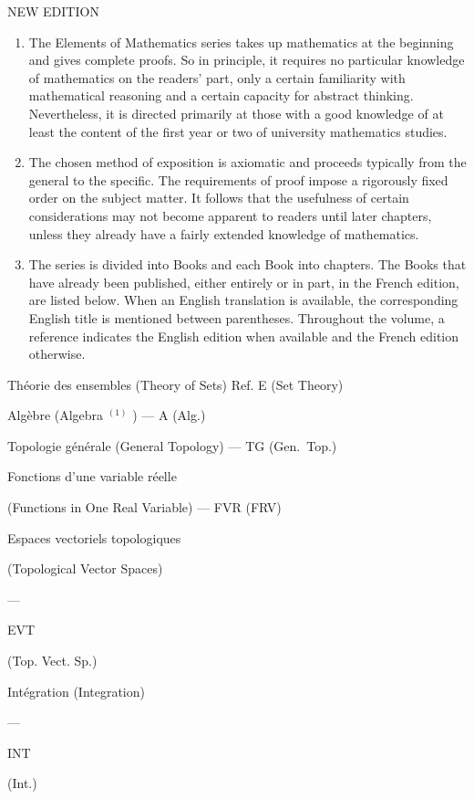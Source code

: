 
NEW EDITION

\begin{enumerate}
\def\labelenumi{\arabic{enumi}.}
\item
  The Elements of Mathematics series takes up mathematics at the beginning and gives complete proofs. So in principle, it requires no particular knowledge of mathematics on the readers' part, only a certain familiarity with mathematical reasoning and a certain capacity for abstract thinking. Nevertheless, it is directed primarily at those with a good knowledge of at least the content of the first year or two of university mathematics studies.
\item
  The chosen method of exposition is axiomatic and proceeds typically from the general to the specific. The requirements of proof impose a rigorously fixed order on the subject matter. It follows that the usefulness of certain considerations may not become apparent to readers until later chapters, unless they already have a fairly extended knowledge of mathematics.
\item
  The series is divided into Books and each Book into chapters. The Books that have already been published, either entirely or in part, in the French edition, are listed below. When an English translation is available, the corresponding English title is mentioned between parentheses. Throughout the volume, a reference indicates the English edition when available and the French edition otherwise.
\end{enumerate}

Théorie des ensembles (Theory of Sets) Ref. E (Set Theory)

Algèbre (Algebra \(^{(1)}\) ) --- A (Alg.)

Topologie générale (General Topology) --- TG (Gen.~Top.)

Fonctions d'une variable réelle

(Functions in One Real Variable) --- FVR (FRV)

Espaces vectoriels topologiques

(Topological Vector Spaces)

---

EVT

(Top. Vect. Sp.)

Intégration (Integration)

---

INT

(Int.)

